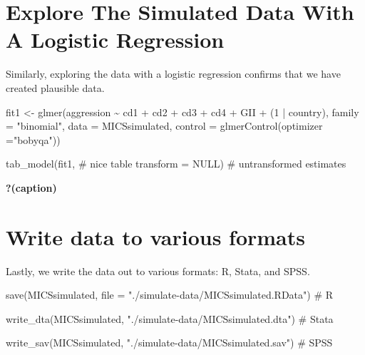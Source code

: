 \documentclass[
  letterpaper,
  DIV=11,
  numbers=noendperiod]{scrreprt}
\newenvironment{Shaded}{\begin{snugshade}}{\end{snugshade}}
\newcommand{\AttributeTok}[1]{\textcolor[rgb]{0.40,0.45,0.13}{#1}}
\newcommand{\CommentTok}[1]{\textcolor[rgb]{0.37,0.37,0.37}{#1}}
\newcommand{\ConstantTok}[1]{\textcolor[rgb]{0.56,0.35,0.01}{#1}}
\newcommand{\DecValTok}[1]{\textcolor[rgb]{0.68,0.00,0.00}{#1}}
\newcommand{\FunctionTok}[1]{\textcolor[rgb]{0.28,0.35,0.67}{#1}}
\newcommand{\NormalTok}[1]{\textcolor[rgb]{0.00,0.23,0.31}{#1}}
\newcommand{\OtherTok}[1]{\textcolor[rgb]{0.00,0.23,0.31}{#1}}
\newcommand{\SpecialCharTok}[1]{\textcolor[rgb]{0.37,0.37,0.37}{#1}}
\newcommand{\StringTok}[1]{\textcolor[rgb]{0.13,0.47,0.30}{#1}}
\begin{document}
\hypertarget{explore-the-simulated-data-with-a-logistic-regression}{%
\section{Explore The Simulated Data With A Logistic
Regression}\label{explore-the-simulated-data-with-a-logistic-regression}}

Similarly, exploring the data with a logistic regression confirms that
we have created plausible data.

\begin{Shaded}
\begin{Highlighting}[]
\NormalTok{fit1 }\OtherTok{\textless{}{-}} \FunctionTok{glmer}\NormalTok{(aggression }\SpecialCharTok{\textasciitilde{}}\NormalTok{ cd1 }\SpecialCharTok{+}\NormalTok{ cd2 }\SpecialCharTok{+}\NormalTok{ cd3 }\SpecialCharTok{+}\NormalTok{ cd4 }\SpecialCharTok{+}\NormalTok{ GII }\SpecialCharTok{+}
\NormalTok{                (}\DecValTok{1} \SpecialCharTok{|}\NormalTok{ country), }
              \AttributeTok{family =} \StringTok{"binomial"}\NormalTok{,}
              \AttributeTok{data =}\NormalTok{ MICSsimulated,}
              \AttributeTok{control =} \FunctionTok{glmerControl}\NormalTok{(}\AttributeTok{optimizer =}\StringTok{"bobyqa"}\NormalTok{))}

\FunctionTok{tab\_model}\NormalTok{(fit1, }\CommentTok{\# nice table}
          \AttributeTok{transform =} \ConstantTok{NULL}\NormalTok{) }\CommentTok{\# untransformed estimates}
\end{Highlighting}
\end{Shaded}

\begin{table}

\caption{\textbf{?(caption)}}

\end{table}

\hypertarget{write-data-to-various-formats}{%
\section{Write data to various
formats}\label{write-data-to-various-formats}}

Lastly, we write the data out to various formats: R, Stata, and SPSS.

\begin{Shaded}
\begin{Highlighting}[]
\FunctionTok{save}\NormalTok{(MICSsimulated, }
     \AttributeTok{file =} \StringTok{"./simulate{-}data/MICSsimulated.RData"}\NormalTok{) }\CommentTok{\# R}

\FunctionTok{write\_dta}\NormalTok{(MICSsimulated, }
          \StringTok{"./simulate{-}data/MICSsimulated.dta"}\NormalTok{) }\CommentTok{\# Stata}

\FunctionTok{write\_sav}\NormalTok{(MICSsimulated, }
          \StringTok{"./simulate{-}data/MICSsimulated.sav"}\NormalTok{) }\CommentTok{\# SPSS}
\end{Highlighting}
\end{Shaded}
\end{document}
